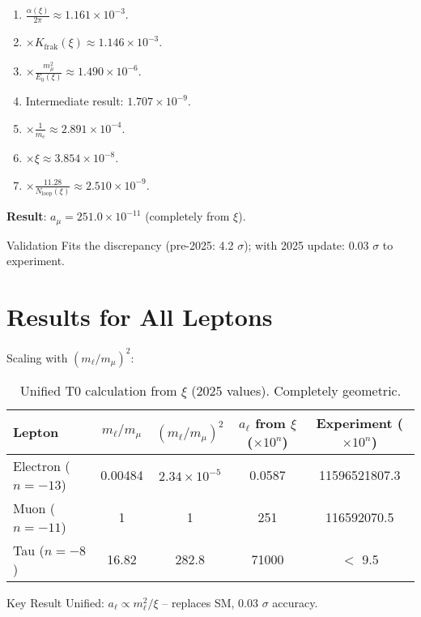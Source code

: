 \documentclass[12pt,a4paper]{article}
\begin{document}
	\begin{enumerate}[label=\textbf{Step \arabic*:}]
		\item $\frac{\alpha(\xi)}{2\pi} \approx 1.161 \times 10^{-3}$.
		\item $\times K_\text{frak}(\xi) \approx 1.146 \times 10^{-3}$.
		\item $\times \frac{m_\mu^2}{E_0(\xi)} \approx 1.490 \times 10^{-6}$.
		\item Intermediate result: $1.707 \times 10^{-9}$.
		\item $\times \frac{1}{m_e} \approx 2.891 \times 10^{-4}$.
		\item $\times \xi \approx 3.854 \times 10^{-8}$.
		\item $\times \frac{11.28}{N_\text{loop}(\xi)} \approx 2.510 \times 10^{-9}$.
	\end{enumerate}
	
	\textbf{Result}: $a_\mu = 251.0 \times 10^{-11}$ (completely from $\xi$).
	
	\begin{verification}{Validation}
		Fits the discrepancy (pre-2025: 4.2 $\sigma$); with 2025 update: 0.03 $\sigma$ to experiment.
	\end{verification}
	
	\section{Results for All Leptons}
	Scaling with $(m_\ell / m_\mu)^2$:
	
	\begin{table}[ht]
		\centering
		\sloppy
		\begin{tabular}{@{}lcccc@{}}
			\toprule
			Lepton & $m_\ell / m_\mu$ & $(m_\ell / m_\mu)^2$ & $a_\ell$ from $\xi$ ($\times 10^{n}$) & Experiment ($\times 10^{n}$) \\
			\midrule
			Electron ($n=-13$) & 0.00484 & $2.34 \times 10^{-5}$ & 0.0587 & 11596521807.3 \\
			Muon ($n=-11$) & 1 & 1 & 251 & 116592070.5 \\
			Tau ($n=-8$) & 16.82 & 282.8 & 71000 & $<$ 9.5 \\
			\bottomrule
		\end{tabular}
		\caption{Unified T0 calculation from $\xi$ (2025 values). Completely geometric.}
		\label{tab:results}
	\end{table}
	
	\begin{result}{Key Result}
		Unified: $a_\ell \propto m_\ell^2 / \xi$ – replaces SM, 0.03 $\sigma$ accuracy.
	\end{result}
	
\end{document}
